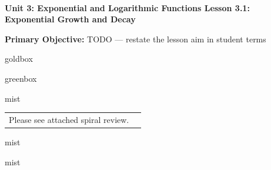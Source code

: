 \documentclass[10pt]{article}
\newcommand{\UnitNumberName}{Unit 3: Exponential and Logarithmic Functions \quad}
\newcommand{\LessonNumberName}{Lesson 3.1: Exponential Growth and Decay}
\begin{document}
\begin{center}
    {\Large\bfseries \CourseName \\
    {\small\bfseries \UnitNumberName \LessonNumberName}}
\end{center}

\begin{tcolorbox}[colback=mist, colframe=royal, boxrule=0.9pt, arc=2mm,
    left=2mm, right=2mm, top=1.5mm, bottom=1.5mm]
    \textbf{Primary Objective:} TODO --- restate the lesson aim in student terms
\end{tcolorbox}

\renewcommand{\arraystretch}{1.6}
\begin{skillbox}{goldbox}
\end{skillbox}

\begin{skillbox}{greenbox}
\end{skillbox}

\begin{fixedskillbox}{mist}
    \begin{tabularx}{\linewidth}{@{}X c@{}}
        \begin{minipage}[t]{0.55\linewidth}\vspace{0pt}
            Please see attached spiral review.  %
        \end{minipage}
        &
        \begin{minipage}[t]{0.38\linewidth}\vspace{0pt}\centering
        \end{minipage}
    \end{tabularx}
\end{fixedskillbox}

\begin{skillbox}[Hook]{mist}
\end{skillbox}

\begin{skillbox}[Lesson]{mist}
\end{skillbox}
\end{document}
